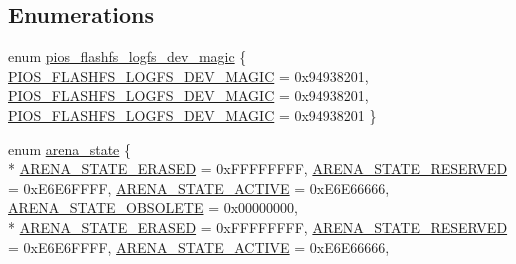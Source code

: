 \subsection*{Enumerations}
\begin{DoxyCompactItemize}
\item 
enum \hyperlink{group___p_i_o_s___f_l_a_s_h_f_s_ga27472bb2a0fbfb6302378ef138c6a41f}{pios\-\_\-flashfs\-\_\-logfs\-\_\-dev\-\_\-magic} \{ \hyperlink{group___p_i_o_s___f_l_a_s_h_f_s_gga27472bb2a0fbfb6302378ef138c6a41fa48f1badb0700a4f00d8da2af591f701b}{P\-I\-O\-S\-\_\-\-F\-L\-A\-S\-H\-F\-S\-\_\-\-L\-O\-G\-F\-S\-\_\-\-D\-E\-V\-\_\-\-M\-A\-G\-I\-C} = 0x94938201, 
\hyperlink{group___p_i_o_s___f_l_a_s_h_f_s_gga27472bb2a0fbfb6302378ef138c6a41fa48f1badb0700a4f00d8da2af591f701b}{P\-I\-O\-S\-\_\-\-F\-L\-A\-S\-H\-F\-S\-\_\-\-L\-O\-G\-F\-S\-\_\-\-D\-E\-V\-\_\-\-M\-A\-G\-I\-C} = 0x94938201, 
\hyperlink{group___p_i_o_s___f_l_a_s_h_f_s_gga27472bb2a0fbfb6302378ef138c6a41fa48f1badb0700a4f00d8da2af591f701b}{P\-I\-O\-S\-\_\-\-F\-L\-A\-S\-H\-F\-S\-\_\-\-L\-O\-G\-F\-S\-\_\-\-D\-E\-V\-\_\-\-M\-A\-G\-I\-C} = 0x94938201
 \}
\item 
enum \hyperlink{group___p_i_o_s___f_l_a_s_h_f_s_gaa936149cfd5559190d20879c10e0fcee}{arena\-\_\-state} \{ \\*
\hyperlink{group___p_i_o_s___f_l_a_s_h_f_s_ggaa936149cfd5559190d20879c10e0fceea0868f5f69dae5f489f86f324fb2ec026}{A\-R\-E\-N\-A\-\_\-\-S\-T\-A\-T\-E\-\_\-\-E\-R\-A\-S\-E\-D} = 0x\-F\-F\-F\-F\-F\-F\-F\-F, 
\hyperlink{group___p_i_o_s___f_l_a_s_h_f_s_ggaa936149cfd5559190d20879c10e0fceeac20424e4b3a3a918490e8c307996fe7c}{A\-R\-E\-N\-A\-\_\-\-S\-T\-A\-T\-E\-\_\-\-R\-E\-S\-E\-R\-V\-E\-D} = 0x\-E6\-E6\-F\-F\-F\-F, 
\hyperlink{group___p_i_o_s___f_l_a_s_h_f_s_ggaa936149cfd5559190d20879c10e0fceea8bac821a323307ac4aa7b2de12f4896b}{A\-R\-E\-N\-A\-\_\-\-S\-T\-A\-T\-E\-\_\-\-A\-C\-T\-I\-V\-E} = 0x\-E6\-E66666, 
\hyperlink{group___p_i_o_s___f_l_a_s_h_f_s_ggaa936149cfd5559190d20879c10e0fceea3943698e7097dd06c6b54f71548d426e}{A\-R\-E\-N\-A\-\_\-\-S\-T\-A\-T\-E\-\_\-\-O\-B\-S\-O\-L\-E\-T\-E} = 0x00000000, 
\\*
\hyperlink{group___p_i_o_s___f_l_a_s_h_f_s_ggaa936149cfd5559190d20879c10e0fceea0868f5f69dae5f489f86f324fb2ec026}{A\-R\-E\-N\-A\-\_\-\-S\-T\-A\-T\-E\-\_\-\-E\-R\-A\-S\-E\-D} = 0x\-F\-F\-F\-F\-F\-F\-F\-F, 
\hyperlink{group___p_i_o_s___f_l_a_s_h_f_s_ggaa936149cfd5559190d20879c10e0fceeac20424e4b3a3a918490e8c307996fe7c}{A\-R\-E\-N\-A\-\_\-\-S\-T\-A\-T\-E\-\_\-\-R\-E\-S\-E\-R\-V\-E\-D} = 0x\-E6\-E6\-F\-F\-F\-F, 
\hyperlink{group___p_i_o_s___f_l_a_s_h_f_s_ggaa936149cfd5559190d20879c10e0fceea8bac821a323307ac4aa7b2de12f4896b}{A\-R\-E\-N\-A\-\_\-\-S\-T\-A\-T\-E\-\_\-\-A\-C\-T\-I\-V\-E} = 0x\-E6\-E66666, 

\end{DoxyCompactItemize}
